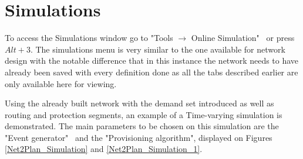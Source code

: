 		
		
		
		
		
		
	
    \newpage
	\section*{Simulations}
	To access the Simulations window go to  "Tools $\rightarrow$ Online Simulation" \ or press $Alt + 3$. The simulations menu is very similar to the one available for network design with the notable difference that in this instance the network needs to have already been saved with every definition done as all the tabs described earlier are only available here for viewing.
	
	Using the already built network with the demand set introduced as well as routing and protection segments, an example of a Time-varying simulation is demonstrated. The main parameters to be chosen on this simulation are the "Event generator" \ and the "Provisioning algorithm", displayed on Figures \ref{Net2Plan_Simulation} and \ref{Net2Plan_Simulation_1}.
	

